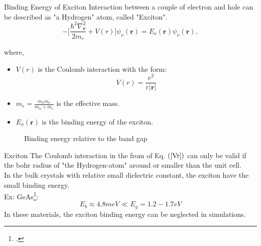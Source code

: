 \documentclass{beamer}
\begin{document}
\begin{frame}{Binding Energy of Exciton}
	\quad Interaction between a couple of electron and hole can be described as "a Hydrogen" atom, called "Exciton".\\
	\begin{equation}
 -\bigg[\frac{\hbar^2\nabla^2_{\textbf{r}}}{2m_r} + V(r)\bigg]\psi_{\nu}(\textbf{r}) = E_{\nu}(\textbf{r})\psi_{\nu}(\textbf{r}),
	\end{equation}
	\begin{multicols}{2}
where,\\
\begin{itemize}
	\item $V(r)$ is the Coulomb interaction with the form:
	\begin{equation}
	\label{Vr}
		V(r) = \frac{e^2}{\varepsilon |\textbf{r}|}
	\end{equation}
	\item $m_r = \frac{m_hm_e}{m_h +m_e}$ is the effective mass.
	\item $E_\nu (\textbf{r})$ is the binding energy of the exciton.
	\vfill
\end{itemize}
		\columnbreak
\begin{figure}
	\caption{Binding energy relative to the band gap}
\end{figure}
	\end{multicols}
\end{frame}
\begin{frame}{Exciton}
\quad The Coulomb interaction in the from of Eq. $(\ref{Vr})$ can only be valid if the bohr radius of "the Hydrogen-atom" around or smaller than the unit cell.\\
\quad In the bulk crystals with relative small dielectric constant, the exciton have the small binding energy.\\
Ex: GeAs\footcite{diakite2016accurateelectronictransportbulk}: $$E_b \approx 4.8 meV \ll E_g = 1.2-1.7 eV$$
\quad In these materials, the exciton binding energy can be neglected in simulations.
\end{frame}
\end{document}
